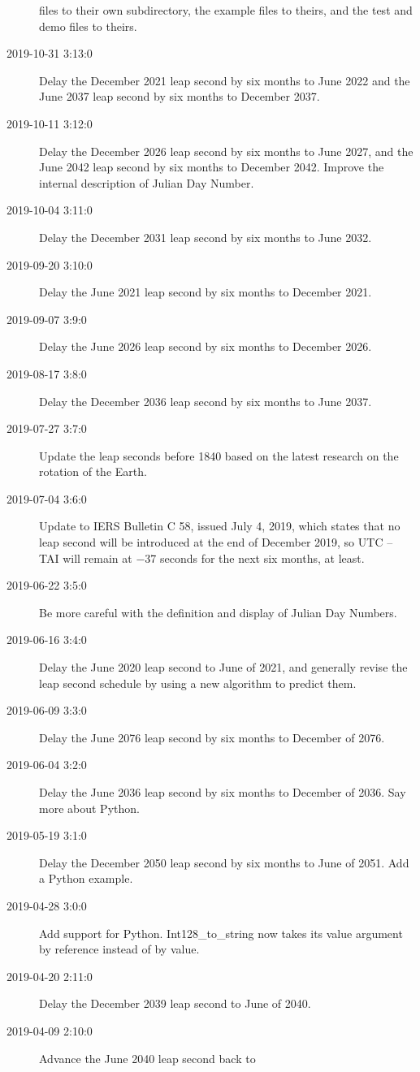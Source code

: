 \documentclass[letterpaper,twoside]{article}
\begin{document}
\begin{description}
  files to their own subdirectory, the example files to theirs,
  and the test and demo files to theirs.
\item[2019-10-31 3:13:0]Delay the December 2021 leap second by
  six months to June 2022 and the June 2037 leap second by six
  months to December 2037.
\item[2019-10-11 3:12:0]Delay the December 2026 leap second by
  six months to June 2027, and the June 2042 leap second by six
  months to December 2042.  Improve the internal description of
  Julian Day Number.
\item[2019-10-04 3:11:0]Delay the December 2031 leap second by
  six months to June 2032.
\item[2019-09-20 3:10:0]Delay the June 2021 leap second by six
  months to December 2021.
\item[2019-09-07 3:9:0]Delay the June 2026 leap second by six months
  to December 2026.
\item[2019-08-17 3:8:0]Delay the December 2036 leap second by six
  months to June 2037.
\item[2019-07-27 3:7:0]Update the leap seconds before 1840 based
  on the latest research on the rotation of the Earth.
\item[2019-07-04 3:6:0]Update to IERS Bulletin C 58, issued July
  4, 2019, which states that no leap second will be introduced
  at the end of December 2019, so UTC -- TAI will remain at
  \num{-37} seconds for the next six months, at least.  
\item[2019-06-22 3:5:0] Be more careful with the definition
  and display of Julian Day Numbers.
\item[2019-06-16 3:4:0] Delay the June 2020 leap second to
  June of 2021, and generally revise the leap second schedule
  by using a new algorithm to predict them.
\item[2019-06-09 3:3:0] Delay the June 2076 leap second by
  six months to December of 2076.
\item[2019-06-04 3:2:0] Delay the June 2036 leap second by
  six months to December of 2036.  Say more about Python.
\item[2019-05-19 3:1:0] Delay the December 2050 leap second
  by six months to June of 2051.  Add a Python example.
\item[2019-04-28 3:0:0] Add support for Python.  Int128\_to\_string
  now takes its value argument by reference instead of by value.
\item[2019-04-20 2:11:0] Delay the December 2039 leap second
  to June of 2040.
\item[2019-04-09 2:10:0] Advance the June 2040 leap second back to

\end{description}
\end{document}
